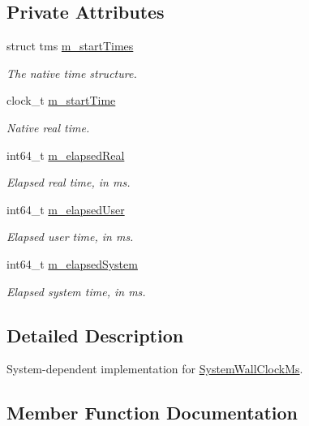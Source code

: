 \subsection*{Private Attributes}
\begin{DoxyCompactItemize}
\item 
struct tms \hyperlink{classns3_1_1SystemWallClockMsPrivate_afd7e8cf04dc6d964b8b6b304de51124f}{m\+\_\+start\+Times}
\begin{DoxyCompactList}\small\item\em The native time structure. \end{DoxyCompactList}\item 
clock\+\_\+t \hyperlink{classns3_1_1SystemWallClockMsPrivate_afccba62a8e771adfc7455bd8a5c15530}{m\+\_\+start\+Time}
\begin{DoxyCompactList}\small\item\em Native real time. \end{DoxyCompactList}\item 
int64\+\_\+t \hyperlink{classns3_1_1SystemWallClockMsPrivate_ad01be5afd1be4bdae6bda288e927112d}{m\+\_\+elapsed\+Real}
\begin{DoxyCompactList}\small\item\em Elapsed real time, in ms. \end{DoxyCompactList}\item 
int64\+\_\+t \hyperlink{classns3_1_1SystemWallClockMsPrivate_a9e58a44e59f4c3ef32e0c43d7c1f7f96}{m\+\_\+elapsed\+User}
\begin{DoxyCompactList}\small\item\em Elapsed user time, in ms. \end{DoxyCompactList}\item 
int64\+\_\+t \hyperlink{classns3_1_1SystemWallClockMsPrivate_aa45d1ea1ff57fbd9405671f43f6f729a}{m\+\_\+elapsed\+System}
\begin{DoxyCompactList}\small\item\em Elapsed system time, in ms. \end{DoxyCompactList}\end{DoxyCompactItemize}


\subsection{Detailed Description}
System-\/dependent implementation for \hyperlink{classns3_1_1SystemWallClockMs}{System\+Wall\+Clock\+Ms}. 

\subsection{Member Function Documentation}
